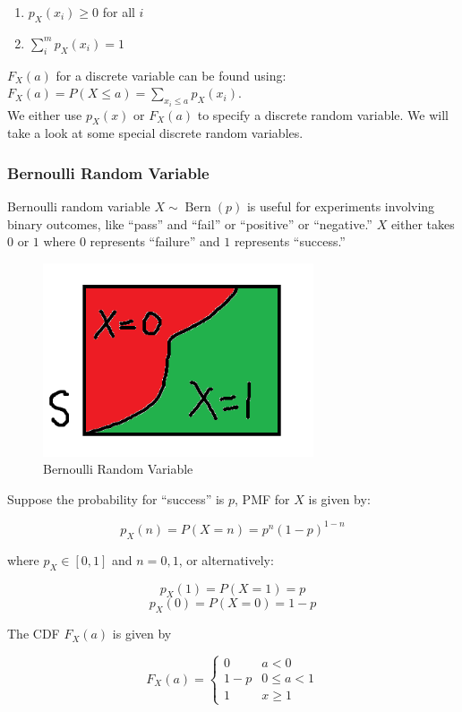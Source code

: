 \documentclass[12pt, a4paper]{article}
\newcommand{\Bern}{\operatorname{Bern}}
\begin{document}
\begin{enumerate}[i]
  \item $p_X (x_i) \ge 0$ for all $i$
  \item $\sum_i^m p_X (x_i)=1$
\end{enumerate}

$F_X(a)$ for a discrete variable can be found using: $F_X(a)=P(X\le a)=\sum_{x_i\le a} p_X(x_i)$. \\

We either use $p_X (x)$ or $F_X (a)$ to specify a discrete random variable. We will take a look at some special discrete random variables.

\subsubsection{Bernoulli Random Variable}

Bernoulli random variable $X \sim \Bern (p)$ is useful for experiments involving binary outcomes, like ``pass'' and ``fail'' or ``positive'' or ``negative.'' $X$ either takes $0$ or $1$ where $0$ represents ``failure'' and $1$ represents ``success.''

\begin{figure}[H]
\centering
\includegraphics[width=80mm]{5.png}
\caption{Bernoulli Random Variable}
\end{figure}

Suppose the probability for ``success'' is $p$, PMF for $X$ is given by:

$$p_X(n)=P(X=n)=p^n(1-p)^{1-n}$$

where $p_X\in[0,1]$ and $n=0,1$, or alternatively:

$$p_X(1)=P(X=1)=p$$
$$p_X(0)=P(X=0)=1-p$$

The CDF $F_X(a)$ is given by

$$
F_X(a)=
\begin{cases} 
0 & a<0 \\
1-p & 0\le a<1 \\
1 & x \ge 1
\end{cases}
$$
\end{document}
